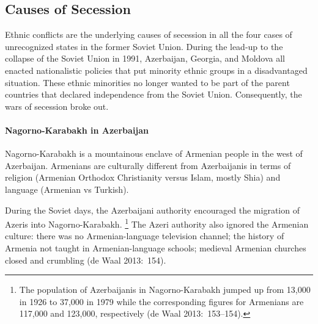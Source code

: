 \documentclass[12pt,a4paper]{article}%
\begin{document}



 

  
\subsection{Causes of Secession}
Ethnic conflicts are the underlying causes of secession in all the four cases of unrecognized states in the former Soviet Union.
During the lead-up to the collapse of the Soviet Union in 1991, Azerbaijan, Georgia, and Moldova all enacted nationalistic policies that put minority ethnic groups in a disadvantaged situation. 
These ethnic minorities no longer wanted to be part of the parent countries that declared independence from the Soviet Union.
Consequently, the wars of secession broke out.

\paragraph{Nagorno-Karabakh in Azerbaijan}
Nagorno-Karabakh is a mountainous enclave of Armenian people in the west of Azerbaijan. 
Armenians are culturally different from Azerbaijanis in terms of religion (Armenian Orthodox Christianity versus Islam, mostly Shia) and language (Armenian vs Turkish). 

During the Soviet days, the Azerbaijani authority encouraged the migration of Azeris into Nagorno-Karabakh.%
\footnote{
	The population of Azerbaijanis in Nagorno-Karabakh jumped up from 13,000 in 1926 to 37,000 in 1979 while the corresponding figures for Armenians are 117,000 and 123,000, respectively (de Waal 2013:\ 153--154).
	} 
The Azeri authority also ignored the Armenian culture: there was no Armenian-language television channel; the history of Armenia not taught in Armenian-language schools; medieval Armenian churches closed and crumbling (de Waal 2013:\ 154).  
\end{document}
